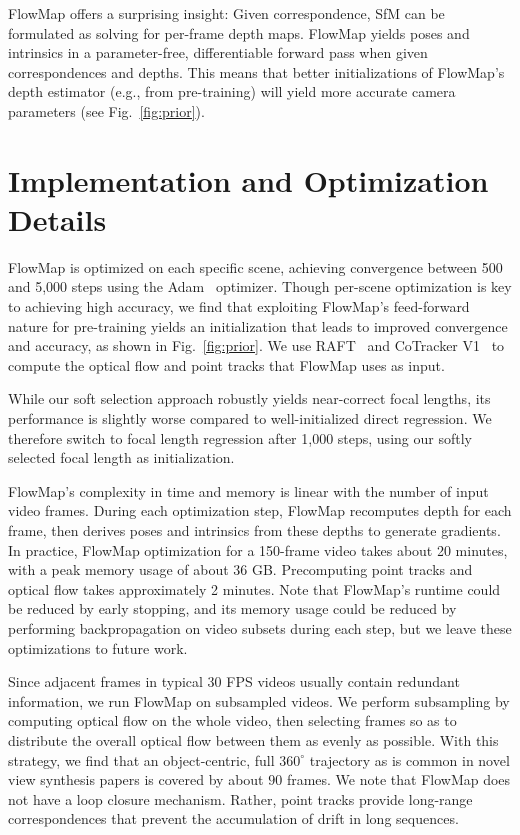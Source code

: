  FlowMap offers a surprising insight: Given correspondence, SfM can be formulated as solving for per-frame depth maps.
FlowMap yields poses and intrinsics in a parameter-free, differentiable forward pass when given correspondences and depths.
This means that better initializations of FlowMap's depth estimator (e.g., from pre-training) will yield more accurate camera parameters (see Fig.~\ref{fig:prior}).



\section{Implementation and Optimization Details}
\label{sec:optimization}
FlowMap is optimized on each specific scene, achieving convergence between 500 and 5,000 steps using the Adam~\cite{kingma2014adam} optimizer.
Though per-scene optimization is key to achieving high accuracy, we find that exploiting FlowMap's feed-forward nature for pre-training yields an initialization that leads to improved convergence and accuracy, as shown in Fig.~\ref{fig:prior}.
We use RAFT~\cite{raft} and CoTracker V1~\cite{karaev2023cotracker} to compute the optical flow and point tracks that FlowMap uses as input.


While our soft selection approach robustly yields near-correct focal lengths, its performance is slightly worse compared to well-initialized direct regression.
We therefore switch to focal length regression after 1,000 steps, using our softly selected focal length as initialization.


FlowMap's complexity in time and memory is linear with the number of input video frames.
During each optimization step, FlowMap recomputes depth for each frame, then derives poses and intrinsics from these depths to generate gradients.
In practice, FlowMap optimization for a 150-frame video takes about 20 minutes, with a peak memory usage of about 36 GB.
Precomputing point tracks and optical flow takes approximately 2 minutes.
Note that FlowMap's runtime could be reduced by early stopping, and its memory usage could be reduced by performing backpropagation on video subsets during each step, but we leave these optimizations to future work.

Since adjacent frames in typical 30 FPS videos usually contain redundant information, we run FlowMap on subsampled videos.
We perform subsampling by computing optical flow on the whole video, then selecting frames so as to distribute the overall optical flow between them as evenly as possible.
With this strategy, we find that an object-centric, full $360^\circ$ trajectory as is common in novel view synthesis papers is covered by about $90$ frames.
We note that FlowMap does not have a loop closure mechanism.
Rather, point tracks provide long-range correspondences that prevent the accumulation of drift in long sequences.

